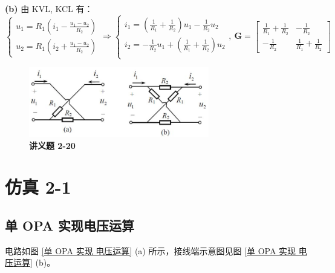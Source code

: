 \documentclass[UTF8]{report}
\theoremstyle{MyLineTheoremStyle} %
\theoremstyle{MyBlockTheoremStyle} %
\theoremstyle{MySubsubsectionStyle} %
\begin{document}
\textbf{(b)} 由 KVL, KCL 有：
\begin{equation}
\begin{cases}
    u_1 = R_1\left( i_1 - \frac{u_1 - u_2}{R_2} \right)\\
    u_2 = R_1 \left( i_2 + \frac{u_1 - u_2}{R_2} \right)
\end{cases}\Longrightarrow  
\begin{cases}
    i_1 = \left( \frac{1}{R_1} + \frac{1}{R_2} \right)u_1 - \frac{1}{R_2}u_2 \\ 
    i_2 =  - \frac{1}{R_2}u_1  + \left( \frac{1}{R_1} + \frac{1}{R_2} \right)u_2\\ 
\end{cases},\ 
\boldsymbol{G} = 
\begin{bmatrix}
    \frac{1}{R_1} + \frac{1}{R_2} & -\frac{1}{R_2} \\ 
    -\frac{1}{R_2} & \frac{1}{R_1} + \frac{1}{R_2}
\end{bmatrix}
\end{equation}

\begin{figure}[H]\centering
\includegraphics[width=0.7\textwidth]{assets/3/image (8).jpg}
\caption{\bfseries 讲义题 2-20}\label{讲义题 2-20}
\end{figure}

\section{仿真 2-1}

\subsection{单 OPA 实现电压运算}

电路如图 \ref{单 OPA 实现 电压运算} (a) 所示，接线端示意图见图 \ref{单 OPA 实现 电压运算} (b)。
\end{document}

